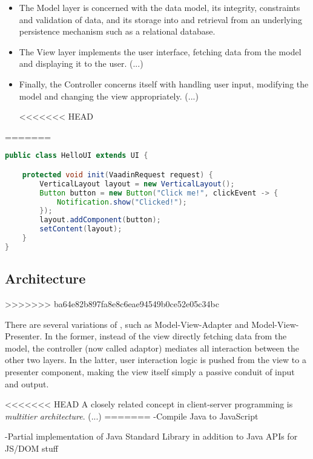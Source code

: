 \begin{itemize}

    \item The Model layer is concerned with the data model, its integrity, constraints and validation of data, and its storage into and retrieval from an underlying persistence mechanism such as a relational database.
    
    \item The View layer implements the user interface, fetching data from the model and displaying it to the user. (...)
    
    \item Finally, the Controller concerns itself with handling user input, modifying the model and changing the view appropriately. (...)

<<<<<<< HEAD
\end{itemize}
=======
\begin{code}
\begin{lstlisting}[language=Java,caption=A simple Vaadin application.\label{listing:vaadin-ui}]
public class HelloUI extends UI {

    protected void init(VaadinRequest request) {
        VerticalLayout layout = new VerticalLayout();
        Button button = new Button("Click me!", clickEvent -> {
            Notification.show("Clicked!");
        });    
        layout.addComponent(button);
        setContent(layout);
    }
}
\end{lstlisting}
\end{code}

\subsection{Architecture}
>>>>>>> ba64e82b897fa8e8c6eae94549b0ce52e05c34bc

There are several variations of , such as Model-View-Adapter and Model-View-Presenter. In the former, instead of the view directly fetching data from the model, the controller (now called adaptor) mediates all interaction between the other two layers. In the latter, user interaction logic is pushed from the view to a presenter component, making the view itself simply a passive conduit of input and output.

<<<<<<< HEAD
A closely related concept in client-server programming is \emph{multitier architecture}. (...)
=======
-Compile Java to JavaScript

-Partial implementation of Java Standard Library in addition to Java APIs for JS/DOM stuff

